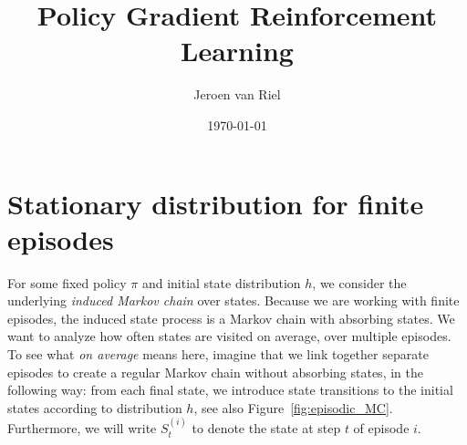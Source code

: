 \documentclass[a4paper]{article}
\author{Jeroen van Riel}
\date{\monthyeardate\today}
\title{Policy Gradient Reinforcement Learning}
\begin{document}
\maketitle

\section{Stationary distribution for finite episodes}

For some fixed policy $\pi$ and initial state distribution $h$, we consider the
underlying \textit{induced Markov chain} over states. Because we are working with finite
episodes, the induced state process is a Markov chain with absorbing states.
%
We want to analyze how often states are visited on average, over multiple episodes.
%
To see what \textit{on average} means here, imagine that we link together separate
episodes to create a regular Markov chain without absorbing states, in the
following way: from each final state, we introduce state transitions to the
initial states according to distribution $h$, see also Figure~\ref{fig:episodic_MC}. Furthermore,
we will write $S_{t}^{(i)}$ to denote the state at step $t$ of episode $i$.
\end{document}
